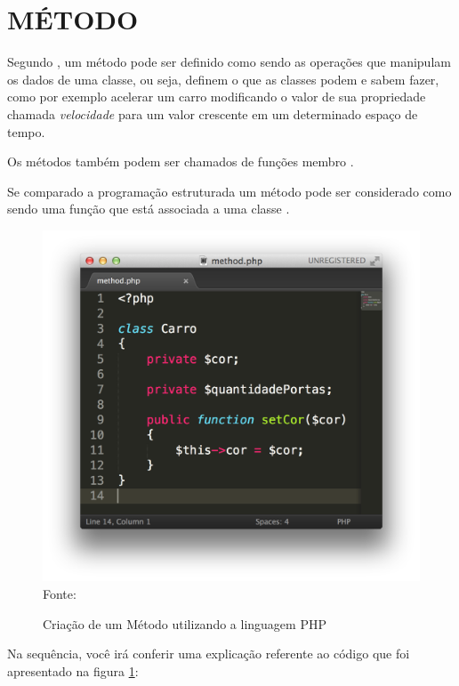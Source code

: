 \section{MÉTODO}

Segundo , um
método pode ser definido como sendo as operações que manipulam os dados de uma 
classe, ou seja, definem o que as classes podem e sabem fazer, como por exemplo 
acelerar um carro modificando o valor de sua propriedade chamada 
\textit{velocidade} para um valor crescente em um determinado espaço de tempo.

Os métodos também podem ser chamados de funções membro \cite{c++ComoProgramar}.

Se comparado a programação estruturada um método pode ser considerado como sendo
uma função que está associada a uma classe \cite{programmingPhp}.

\begin{figure}[h!tb]
	\centering
	\caption{Criação de um Método utilizando a linguagem PHP}
	\includegraphics[width=\textwidth]{images/method.png}
	\label{fig:metodo}
	\centering
	\footnotesize Fonte: \fonteOAutor
\end{figure}

\FloatBarrier 	%

Na sequência, você irá conferir uma explicação referente ao código que foi
apresentado na figura \ref{fig:metodo}:

